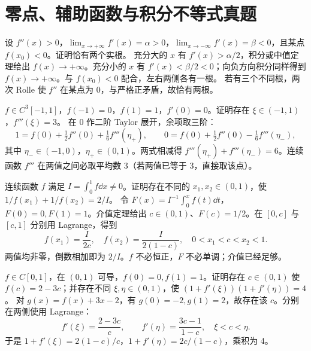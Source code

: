 
\section{零点、辅助函数与积分不等式真题}
设 $f''(x)>0$，$\lim_{x\to+\infty}f'(x)=\alpha>0$，$\lim_{x\to-\infty}f'(x)=\beta<0$，且某点 $f(x_0)<0$。证明恰有两个实根。
\sol 充分大的 $x$ 有 $f'(x)>\alpha/2$，积分或中值定理给出 $f(x)\to+\infty$。充分小的 $x$ 有 $f'(x)<\beta/2<0$；向负方向积分同样得到 $f(x)\to+\infty$。与 $f(x_0)<0$ 配合，左右两侧各有一根。
若有三个不同根，两次 Rolle 使 $f''$ 在某点为 0，与严格正矛盾，故恰有两根。

$f\in C^3[-1,1]$，$f(-1)=0$，$f(1)=1$，$f'(0)=0$。证明存在 $\xi\in(-1,1)$，$f'''(\xi)=3$。
\sol 在 0 作二阶 Taylor 展开，余项取三阶：
\[1=f(0)+\tfrac12f''(0)+\tfrac16f'''(\eta_+),\qquad
0=f(0)+\tfrac12f''(0)-\tfrac16f'''(\eta_-),\]
其中 $\eta_-\in(-1,0)$，$\eta_+\in(0,1)$。两式相减得 $f'''(\eta_+)+f'''(\eta_-)=6$。连续函数 $f'''$ 在两值之间必取平均数 3（若两值已等于 3，直接取该点）。

连续函数 $f$ 满足 $I=\int_0^1 f\dd x\ne0$。证明存在不同的 $x_1,x_2\in(0,1)$，使 $1/f(x_1)+1/f(x_2)=2/I$。
\sol 令 $F(x)=I^{-1}\int_0^x f(t)\dd t$，$F(0)=0,F(1)=1$。介值定理给出 $c\in(0,1)$、$F(c)=1/2$。在 $[0,c]$ 与 $[c,1]$ 分别用 Lagrange，得到
\[f(x_1)=\frac I{2c},\quad f(x_2)=\frac I{2(1-c)},\quad 0<x_1<c<x_2<1.\]
两值均非零，倒数相加即为 $2/I$。$f$ 不必恒正，$F$ 不必单调；介值已经足够。

$f\in C[0,1]$，在 $(0,1)$ 可导，$f(0)=0,f(1)=1$。证明存在 $c\in(0,1)$ 使 $f(c)=2-3c$；并存在不同 $\xi,\eta\in(0,1)$，使 $(1+f'(\xi))(1+f'(\eta))=4$。
\sol 对 $g(x)=f(x)+3x-2$，有 $g(0)=-2,g(1)=2$，故存在该 $c$。分别在两侧使用 Lagrange：
\[f'(\xi)=\frac{2-3c}{c},\qquad f'(\eta)=\frac{3c-1}{1-c},\quad \xi<c<\eta.\]
于是 $1+f'(\xi)=2(1-c)/c$，$1+f'(\eta)=2c/(1-c)$，乘积为 4。

